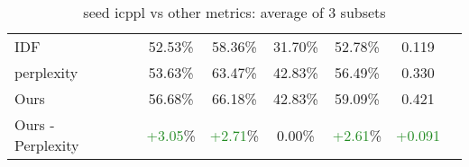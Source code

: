\begin{table*}[t!]
{\begin{tabular}{l|l|c|c|c|c|c|c|c}
    IDF  &   &   & 52.53\% & 58.36\% & 31.70\% & 52.78\% & 0.119 \\
    perplexity  &   &   & 53.63\% & 63.47\% & 42.83\% & 56.49\% & 0.330 \\
    Ours  &   &   & 56.68\% & 66.18\% & 42.83\% & 59.09\% & 0.421 \\
    \hline
    Ours - Perplexity  &   &   & \textcolor{ForestGreen}{+3.05}\% & \textcolor{ForestGreen}{+2.71}\% & 0.00\% & \textcolor{ForestGreen}{+2.61}\% & \textcolor{ForestGreen}{+0.091} \\
    \hline
  \end{tabular}}
  \caption{seed icppl vs other metrics: average of 3 subsets}
  \label{tab:icppl vs other metrics: average of 3 subsets}
\end{table*}
